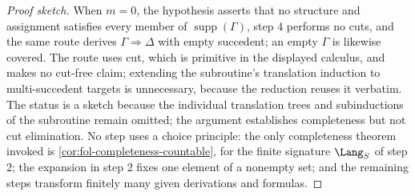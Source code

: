 \begin{proof}[Proof sketch]
When \(m=0\), the hypothesis asserts that no structure and assignment
satisfies every member of \(\operatorname{supp}(\Gamma)\), step 4
performs no cuts, and the same route derives
\(\Gamma\Rightarrow\Delta\) with empty succedent; an empty \(\Gamma\) is
likewise covered.  The route uses cut, which is primitive in the
displayed calculus, and makes no cut-free claim; extending the
subroutine's translation induction to multi-succedent targets is
unnecessary, because the reduction reuses it verbatim.  The status is a
sketch because the individual translation trees and subinductions of the
subroutine remain omitted; the argument establishes completeness but not
cut elimination.  No step uses a choice principle: the only
completeness theorem invoked is \cref{cor:fol-completeness-countable}, for
the finite signature \(\Lang_S\) of step 2; the expansion in step 2 fixes
one element of a nonempty set; and the remaining steps transform finitely
many given derivations and formulas.
\end{proof}

